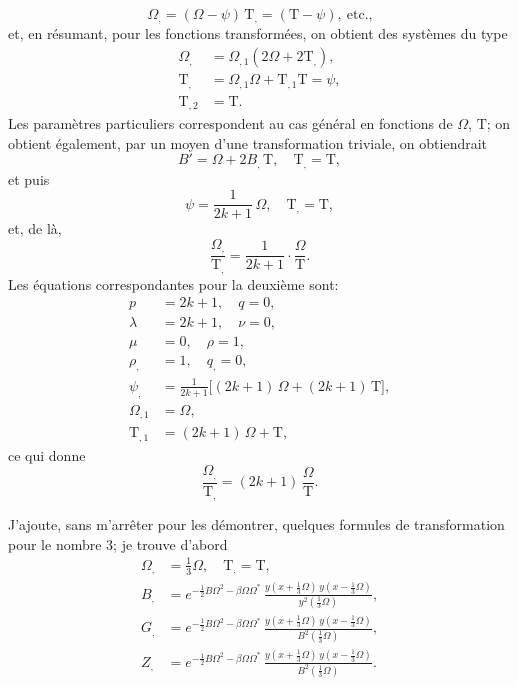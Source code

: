 \documentclass[11pt,a4paper]{article}
\begin{document}
\[
\Omega_{,} = (\Omega - \psi)\,\mathrm{T}_{,} = (\mathrm{T} - \psi),\ \text{etc.,}
\]
et, en r\'esumant, pour les fonctions transform\'ees, on obtient des syst\`emes du type
\begin{align*}
\Omega_{,} &= \Omega_{,1}(2\Omega + 2\mathrm{T}_{,}),\\
\mathrm{T}_{,} &= \Omega_{,1}\Omega + \mathrm{T}_{,1}\mathrm{T} = \psi,\\
\mathrm{T}_{,2} &= \mathrm{T}.
\end{align*}
Les param\`etres particuliers correspondent au cas g\'en\'eral en fonctions de $\Omega$, $\mathrm{T}$; on obtient \'egalement, par un moyen d'une transformation triviale, on obtiendrait
\[ B' = \Omega + 2 B_{,}\, \mathrm{T},\quad \mathrm{T}_{,} = \mathrm{T}, \]
et puis
\[
\psi = \frac{1}{2k+1}\,\Omega,\quad \mathrm{T}_{,} = \mathrm{T},
\]
et, de l\`a,
\[
\frac{\Omega_{,}}{\mathrm{T}_{,}} = \frac{1}{2k+1}\cdot\frac{\Omega}{\mathrm{T}}.
\]
Les \'equations correspondantes pour la deuxi\`eme sont:
\begin{align*}
p &= 2k+1,\quad q = 0,\\
\lambda &= 2k+1,\quad \nu = 0,\\
\mu &= 0,\quad \rho = 1,\\
\rho_{,} &= 1,\quad q_{,} = 0,\\
\psi_{,} &= \frac{1}{2k+1}\bigl[(2k+1)\,\Omega + (2k+1)\,\mathrm{T}\bigr],\\
\Omega_{,1} &= \Omega,\\
\mathrm{T}_{,1} &= (2k+1)\,\Omega + \mathrm{T},
\end{align*}
ce qui donne
\[
\frac{\Omega_{,}}{\mathrm{T}_{,}} = (2k+1)\,\frac{\Omega}{\mathrm{T}}.
\]

\medskip

J'ajoute, sans m'arr\^eter pour les d\'emontrer, quelques formules de transformation pour le nombre $3$; je trouve d'abord
\begin{align*}
\Omega_{,} &= \tfrac{1}{3}\Omega,\quad \mathrm{T}_{,} = \mathrm{T},\\
B_{,} &= e^{-\frac{1}{2}B\Omega^2 - \beta\Omega\Omega^*}\,\frac{y(x + \tfrac{1}{3}\Omega)\,y(x - \tfrac{1}{3}\Omega)}{y^2(\tfrac{1}{3}\Omega)},\\
G_{,} &= e^{-\frac{1}{2}B\Omega^2 - \beta\Omega\Omega^*}\,\frac{y(x + \tfrac{1}{3}\Omega)\,y(x - \tfrac{1}{3}\Omega)}{B^2(\tfrac{1}{3}\Omega)},\\
Z_{,} &= e^{-\frac{1}{2}B\Omega^2 - \beta\Omega\Omega^*}\,\frac{y(x + \tfrac{1}{3}\Omega)\,y(x - \tfrac{1}{3}\Omega)}{B^2(\tfrac{1}{3}\Omega)}.
\end{align*}
\end{document}
